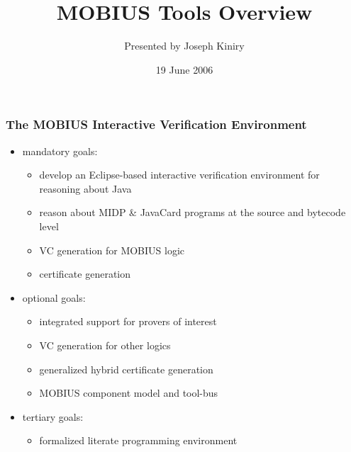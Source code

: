 \documentclass{beamer}
\title{MOBIUS Tools Overview}
\author[J. Kiniry (UCD)]{Presented by Joseph Kiniry}
\institute{INRIA, RUN, UCD, UW\\[1ex]
  \texttt{[image: ../../../TexInputs/mobius\_transparent]}}
\date{19 June 2006}
\begin{document}
\begin{frame}
  \titlepage
\end{frame}

\begin{frame}\frametitle{The MOBIUS Interactive Verification Environment}
  \begin{itemize}
  \item mandatory goals:
    \begin{itemize}
    \item develop an Eclipse-based interactive verification environment
      for reasoning about Java
    \item reason about MIDP \& JavaCard programs at the source and
      bytecode level
    \item VC generation for MOBIUS logic
    \item certificate generation
    \end{itemize}
  \item optional goals:
    \begin{itemize}
    \item integrated support for provers of interest
    \item VC generation for other logics
    \item generalized hybrid certificate generation
    \item MOBIUS component model and tool-bus
    \end{itemize}
  \item tertiary goals:
    \begin{itemize}
    \item formalized literate programming environment
    \end{itemize}
  \end{itemize}
\end{frame}
\end{document}

